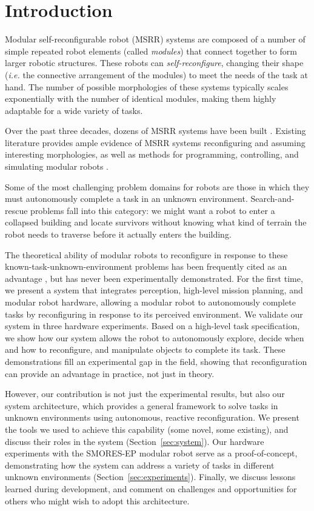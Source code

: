 \documentclass[journal]{IEEEtran}
\begin{document}
\section{Introduction} \label{sec:introduction}
%
Modular self-reconfigurable robot (MSRR) systems are composed of a number of simple repeated robot elements (called \emph{modules}) that connect together to form larger robotic structures. These robots can \emph{self-reconfigure}, changing their shape (\emph{i.e.} the connective arrangement of the modules) to meet the needs of the task at hand.
The number of possible morphologies of these systems typically scales exponentially with the number of identical modules, making them highly adaptable for a wide variety of tasks.

Over the past three decades, dozens of MSRR systems have been built \cite{Yim2007a}. Existing literature provides ample evidence of MSRR systems reconfiguring and assuming interesting morphologies, as well as methods for programming, controlling, and simulating modular robots \cite{Yim2007,Jing2016,Yim1994}.

Some of the most challenging problem domains for robots are those in which they must autonomously complete a task in an unknown environment. Search-and-rescue problems fall into this category: we might want a robot to enter a collapsed building and locate survivors without knowing what kind of terrain the robot needs to traverse before it actually enters the building.

The theoretical ability of modular robots to reconfigure in response to these known-task-unknown-environment problems has been frequently cited as an advantage \cite{Yim2007a}, but has never been experimentally demonstrated.
For the first time, we present a system that integrates perception, high-level mission planning, and modular robot hardware, allowing a modular robot to autonomously complete tasks by reconfiguring in response to its perceived environment.
We validate our system in three hardware experiments.  Based on a high-level task specification, we show how our system allows the robot to autonomously explore, decide when and how to reconfigure, and manipulate objects to complete its task.
These demonstrations fill an experimental gap in the field, showing that reconfiguration can provide an advantage in practice, not just in theory.

However, our contribution is not just the experimental results, but also our system architecture, which provides a general framework to solve tasks in unknown environments using autonomous, reactive reconfiguration.  We present the tools we used to achieve this capability (some novel, some existing), and discuss their roles in the system (Section~\ref{sec:system}).  Our hardware experiments with the SMORES-EP modular robot serve as a proof-of-concept, demonstrating how the system can address a variety of tasks in different unknown environments (Section~\ref{sec:experiments}).  Finally, we discuss lessons learned during development, and comment on challenges and opportunities for others who might wish to adopt this architecture.
\end{document}
